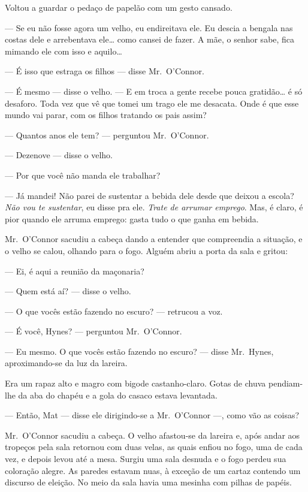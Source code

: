 Voltou a guardar o pedaço de papelão com um gesto cansado.

--- Se eu não fosse agora um velho, eu endireitava ele.  Eu descia a bengala
nas costas dele e arrebentava ele\ldots{} como cansei de fazer.  A mãe, o
senhor sabe, fica mimando ele com isso e aquilo\ldots{}

--- É isso que estraga os filhos --- disse Mr.~O’Connor.

--- É mesmo --- disse o velho.  --- E em troca a gente recebe pouca
gratidão\ldots{} é só desaforo.  Toda vez que vê que tomei um trago ele me
desacata.  Onde é que esse mundo vai parar, com os filhos tratando os pais
assim?

--- Quantos anos ele tem? --- perguntou Mr.~O’Connor.

--- Dezenove --- disse o velho.

--- Por que você não manda ele trabalhar?

--- Já mandei!  Não parei de sustentar a bebida dele desde que deixou a escola?
\textit{Não vou te sustentar}, eu disse pra ele.  \textit{Trate de arrumar
emprego}.  Mas, é claro, é pior quando ele arruma emprego: gasta tudo o que
ganha em bebida.

Mr.~O’Connor sacudiu a cabeça dando a entender que compreendia a situação, e o
velho se calou, olhando para o fogo.  Alguém abriu a porta da sala e gritou:

--- Ei, é aqui a reunião da maçonaria?

--- Quem está aí? --- disse o velho.

--- O que vocês estão fazendo no escuro? --- retrucou a voz.

--- É você, Hynes? --- perguntou Mr.~O’Connor.

--- Eu mesmo.  O que vocês estão fazendo no escuro? --- disse Mr.~Hynes,
aproximando-se da luz da lareira.

Era um rapaz alto e magro com bigode castanho-claro.  Gotas de chuva
pendiam-lhe da aba do chapéu e a gola do casaco estava levantada.

--- Então, Mat --- disse ele dirigindo-se a Mr.~O’Connor ---, como vão as
coisas?

Mr.~O’Connor sacudiu a cabeça.  O velho afastou-se da lareira e, após andar aos
tropeços pela sala retornou com duas velas, as quais enfiou no fogo, uma de
cada vez, e depois levou até a mesa.  Surgiu uma sala desnuda e o fogo perdeu
sua coloração alegre.  As paredes estavam nuas, à exceção de um cartaz contendo
um discurso de eleição.  No meio da sala havia uma mesinha com pilhas de
papéis.

